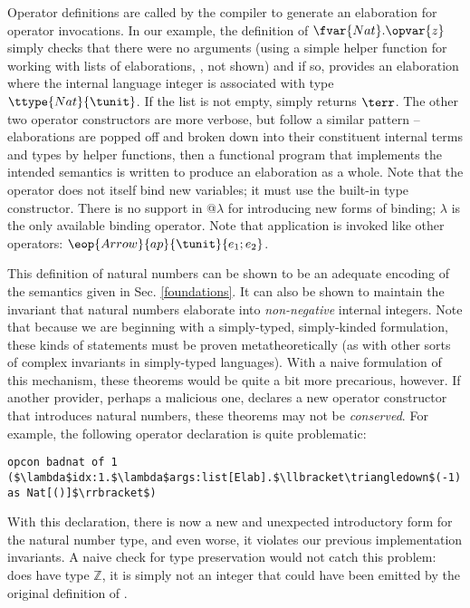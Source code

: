 Operator definitions are called by the compiler to generate an elaboration for operator invocations. In our example, the definition of $\fvar{Nat}.\opvar{z}$ simply checks that there were no arguments (using a simple helper function for working with lists of elaborations, , not shown) and if so, provides an elaboration where the internal language integer  is associated with type $\ttype{Nat}{\tunit}$. If the list is not empty,  simply returns $\terr$. The other two operator constructors are more verbose, but follow a similar pattern -- elaborations are popped off and broken down into their constituent internal terms and types by helper functions, then a functional program that implements the intended semantics is written to produce an elaboration as a whole. Note that the  operator does not itself bind new variables; it must use the built-in  type constructor. There is no support in @$\lambda$ for introducing new forms of binding; $\lambda$ is the only available binding operator. Note that application is invoked like other operators: $\eop{Arrow}{ap}{\tunit}{e_1; e_2}$.

This definition of natural numbers can be shown to be an adequate encoding of the semantics given in Sec. \ref{foundations}. It can also be shown to maintain the invariant that natural numbers elaborate into \emph{non-negative} internal integers. Note that because we are beginning with a simply-typed, simply-kinded formulation, these kinds of statements must be proven metatheoretically (as with other sorts of complex invariants in simply-typed languages). With a naive formulation of this mechanism, these theorems would be quite a bit more precarious, however. If another provider, perhaps a malicious one, declares a new operator constructor that introduces natural numbers, these theorems may not be \emph{conserved}. For example, the following operator declaration is quite problematic:

\begin{lstlisting}
opcon badnat of 1 ($\lambda$idx:1.$\lambda$args:list[Elab].$\llbracket\triangledown$(-1) as Nat[()]$\rrbracket$)
\end{lstlisting}

With this declaration, there is now a new and unexpected introductory form for the natural number type, and even worse, it violates our previous implementation invariants. A naive check for type preservation would not catch this problem:  does have type $\mathbb{Z}$, it is simply not an integer that could have been emitted by the original definition of .

